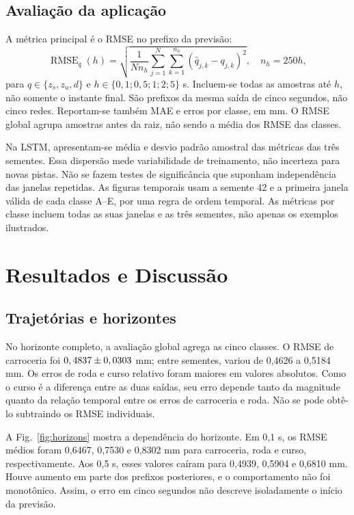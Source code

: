 \documentclass[conference]{IEEEtran}
\begin{document}
\subsection{Avaliação da aplicação}
A métrica principal é o RMSE no prefixo da previsão:
\begin{equation}
\operatorname{RMSE}_q(h)=
\sqrt{\frac{1}{Nn_h}\sum_{j=1}^{N}\sum_{k=1}^{n_h}
(\hat q_{j,k}-q_{j,k})^2},\quad n_h=250h,
\end{equation}
para $q\in\{z_s,z_u,d\}$ e $h\in\{0{,}1;0{,}5;1;2;5\}$ s. Incluem-se todas as amostras até $h$, não somente o instante final. São prefixos da mesma saída de cinco segundos, não cinco redes. Reportam-se também MAE e erros por classe, em mm. O RMSE global agrupa amostras antes da raiz, não sendo a média dos RMSE das classes.

Na LSTM, apresentam-se média e desvio padrão amostral das métricas das três sementes. Essa dispersão mede variabilidade de treinamento, não incerteza para novas pistas. Não se fazem testes de significância que suponham independência das janelas repetidas. As figuras temporais usam a semente 42 e a primeira janela válida de cada classe A--E, por uma regra de ordem temporal. As métricas por classe incluem todas as suas janelas e as três sementes, não apenas os exemplos ilustrados.



\section{Resultados e Discussão}
\subsection{Trajetórias e horizontes}
No horizonte completo, a avaliação global agrega as cinco classes. O RMSE de carroceria foi $0,4837\pm0,0303$ mm; entre sementes, variou de 0,4626 a 0,5184 mm. Os erros de roda e curso relativo foram maiores em valores absolutos. Como o curso é a diferença entre as duas saídas, seu erro depende tanto da magnitude quanto da relação temporal entre os erros de carroceria e roda. Não se pode obtê-lo subtraindo os RMSE individuais.



A Fig.~\ref{fig:horizons} mostra a dependência do horizonte. Em 0,1 s, os RMSE médios foram 0,6467, 0,7530 e 0,8302 mm para carroceria, roda e curso, respectivamente. Aos 0,5 s, esses valores caíram para 0,4939, 0,5904 e 0,6810 mm. Houve aumento em parte dos prefixos posteriores, e o comportamento não foi monotônico. Assim, o erro em cinco segundos não descreve isoladamente o início da previsão.
\end{document}
